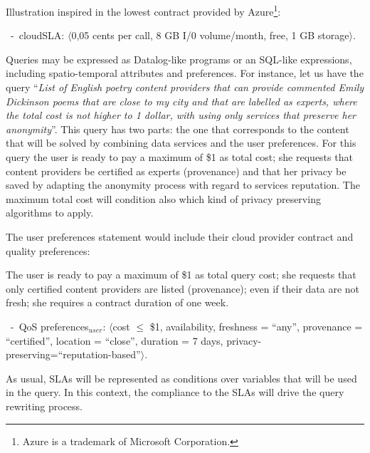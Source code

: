 Illustration inspired in the lowest contract provided by Azure\footnote{Azure is a trademark of Microsoft Corporation.}: 
 \begin{trivlist}\sf\footnotesize
\item[~-~cloudSLA:]  $\langle$0,05 cents per call, 8 GB I/0 volume/month, free, 1 GB storage$\rangle$. 
\end{trivlist}

 
 

Queries may be expressed as Datalog-like programs or an SQL-like expressions, including spatio-temporal attributes and preferences.
For instance, let us have the query ``\textit{List of English poetry content providers that can provide commented Emily Dickinson poems that are close to my city and that are labelled as experts, where the total cost is not higher to 1 dollar, with using only services that preserve her anonymity}''. 
This query has two parts: the one that corresponds to the content that will be solved by combining data services and the user preferences. For this query the user is ready to pay a maximum of \$1 as total cost; she requests that content providers be certified as experts (provenance) and that her privacy be saved by adapting the anonymity process with regard to services reputation. The maximum total cost will condition also which kind of privacy preserving algorithms to apply.

The user preferences statement would include their cloud provider contract and quality preferences:



The user is ready to pay a maximum of {\sf \$1 as total query cost}; she requests that only {\sf certified} content providers are listed (provenance); even if their data are not fresh; she requires a contract duration of one week.

\begin{trivlist}\sf\footnotesize
\item[~-~QoS preferences$_\mathit{user}$: ] $\langle$cost $\leq$ \$1, availability, freshness = ``any'', provenance = ``certified'', location = ``close'', duration = 7 days, privacy-preserving=``reputation-based''$\rangle$. 
\end{trivlist}

As usual, SLAs will be represented as conditions over variables that will be used in the query.
In this context, the compliance to the SLAs will drive the query rewriting process.


